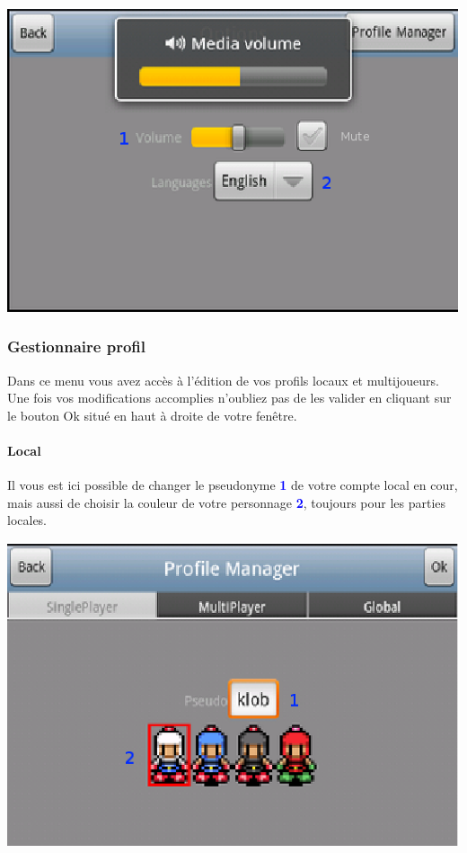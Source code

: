 	\begin{center}
		\includegraphics[scale=0.8]{Manuel/Img/4.eps}
	\end{center}
	
	\subsubsection{Gestionnaire profil}
		Dans ce menu vous avez accès à l'édition de vos profils locaux et
		multijoueurs. Une fois vos modifications accomplies n'oubliez pas de les
		valider en cliquant sur le bouton Ok situé en haut à droite de votre fenêtre.
		\paragraph{Local\\}
		Il vous est ici possible de changer le pseudonyme \textcolor{blue}{\textbf{1}}
		de votre compte local en cour, mais aussi de choisir la couleur de votre
		personnage \textcolor{blue}{\textbf{2}}, toujours pour les parties locales.
		\begin{center}
				\includegraphics[scale=0.8]{Manuel/Img/5.eps}
			\end{center}
		
